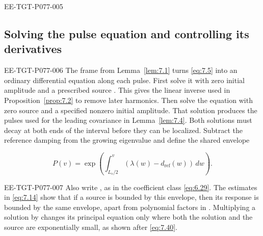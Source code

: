 \begin{EESegment}{EE-TGT-P077-005}
\subsection{Solving the pulse equation and controlling its derivatives}\label{sec:7.2}
\end{EESegment}
\begin{EESegment}{EE-TGT-P077-006}
The frame  from Lemma~\ref{lem:7.1} turns \eqref{eq:7.5} into an ordinary differential equation along each pulse. First solve it with zero initial amplitude and a prescribed source . This gives the linear inverse used in Proposition~\ref{prop:7.2} to remove later harmonics. Then solve the equation with zero source and a specified nonzero initial amplitude. That solution produces the pulses used for the leading covariance in Lemma~\ref{lem:7.4}. Both solutions must decay at both ends of the interval before they can be localized. Subtract the reference damping from the growing eigenvalue and define the shared envelope
\end{EESegment}
\begin{equation}
P(v)=\exp\left(\int_{L_s/2}^{v}(\lambda(w)-d_{\mathrm{ref}}(w))\,dw\right).
\tag{7.12}\label{eq:7.12}
\end{equation}
\begin{EESegment}{EE-TGT-P077-007}
Also write , as in the coefficient class \eqref{eq:6.29}. The estimates in \eqref{eq:7.14} show that if a source is bounded by this envelope, then its response is bounded by the same envelope, apart from polynomial factors in . Multiplying a solution by  changes its principal equation only where both the solution and the source are exponentially small, as shown after \eqref{eq:7.40}.
\end{EESegment}

